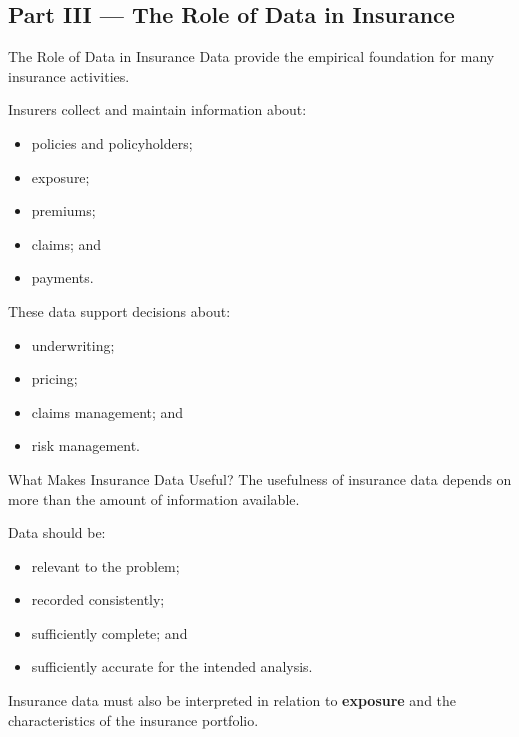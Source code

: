 \documentclass[
  ignorenonframetext,
  aspectratio=169,
]{beamer}
\providecommand{\tightlist}{%
  \setlength{\itemsep}{0pt}\setlength{\parskip}{0pt}}
\begin{document}
\subsection{Part III --- The Role of Data in
Insurance}\label{part-iii-the-role-of-data-in-insurance}

\begin{frame}{The Role of Data in Insurance}
\protect{}\label{the-role-of-data-in-insurance}
Data provide the empirical foundation for many insurance activities.

Insurers collect and maintain information about:

\begin{itemize}
\tightlist
\item
  policies and policyholders;
\item
  exposure;
\item
  premiums;
\item
  claims; and
\item
  payments.
\end{itemize}

These data support decisions about:

\begin{itemize}
\tightlist
\item
  underwriting;
\item
  pricing;
\item
  claims management; and
\item
  risk management.
\end{itemize}
\end{frame}

\begin{frame}{What Makes Insurance Data Useful?}
\protect{}\label{what-makes-insurance-data-useful}
The usefulness of insurance data depends on more than the amount of
information available.

Data should be:

\begin{itemize}
\tightlist
\item
  relevant to the problem;
\item
  recorded consistently;
\item
  sufficiently complete; and
\item
  sufficiently accurate for the intended analysis.
\end{itemize}

Insurance data must also be interpreted in relation to \textbf{exposure}
and the characteristics of the insurance portfolio.
\end{frame}
\end{document}
